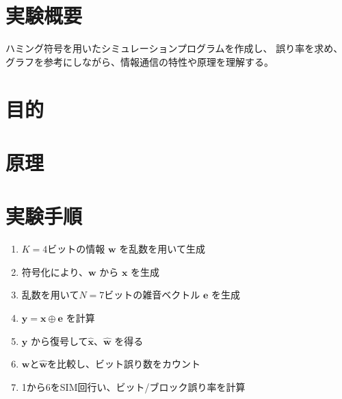 \documentclass[12pt]{jarticle}
\begin{document}



\section{実験概要}
ハミング符号を用いたシミュレーションプログラムを作成し、
誤り率を求め、グラフを参考にしながら、情報通信の特性や原理を理解する。

\section{目的}
\section{原理}

\section{実験手順}
\begin{enumerate}
    \item $K=4$ビットの情報 $\boldsymbol{w}$ を乱数を用いて生成
    \item 符号化により、$\boldsymbol{w}$ から $\boldsymbol{x}$ を生成
    \item 乱数を用いて$N=7$ビットの雑音ベクトル $\boldsymbol{e}$ を生成
    \item $\boldsymbol{y}=\boldsymbol{x}\oplus \boldsymbol{e}$ を計算
    \item $\boldsymbol{y}$ から復号して$\hat{\boldsymbol{x}}$、$\hat{\boldsymbol{w}}$ を得る
    \item $\boldsymbol{w}$と$\hat{\boldsymbol{w}}$を比較し、ビット誤り数をカウント
    \item 1から6をSIM回行い、ビット/ブロック誤り率を計算
\end{enumerate}
\end{document}
